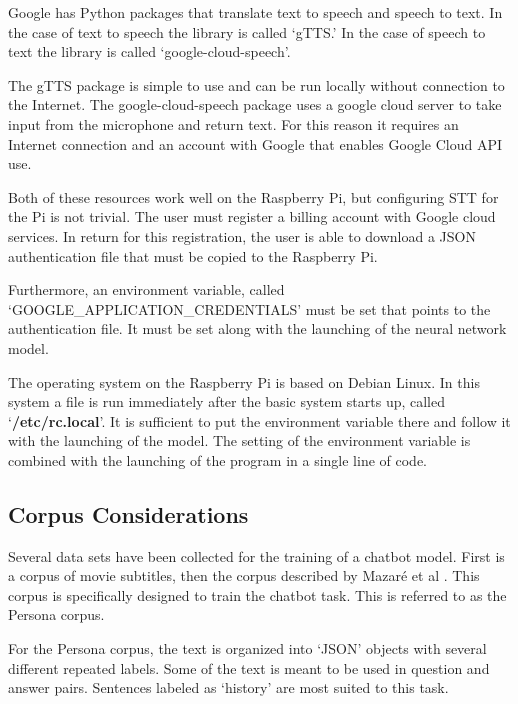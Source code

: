 Google has Python packages that translate text to speech and speech to text. In the case of text to speech the library is called `\ac{gTTS}.' In the case of speech to text the library is called `google-cloud-speech'. 

The gTTS package is simple to use and can be run locally without connection to the Internet. The google-cloud-speech package uses a google cloud server to take input from the microphone and return text. For this reason it requires an Internet connection and an account with Google that enables Google Cloud API use. %

Both of these resources work well on the Raspberry Pi, but configuring STT for the Pi is not trivial. The user must register a billing account with Google cloud services. In return for this registration, the user is able to download a JSON authentication file that must be copied to the Raspberry Pi. 

Furthermore, an environment variable, called `GOOGLE\_APPLICATION\_CREDENTIALS' must be set that points to the authentication file. It must be set along with the launching of the neural network model.

The operating system on the Raspberry Pi is based on Debian Linux. In this system a file is run immediately after the basic system starts up, called `\textbf{/etc/rc.local}'. It is sufficient to put the environment variable there and follow it with the launching of the model. The setting of the environment variable is combined with the launching of the program in a single line of code.


\subsection{Corpus Considerations}

Several data sets have been collected for the training of a chatbot model. First is a corpus of movie subtitles, then the corpus described by Mazar{\'{e}} et al \cite{DBLP:journals/corr/abs-1809-01984}. This corpus is specifically designed to train the chatbot task. This is referred to as the Persona corpus.

For the Persona corpus, the text is organized into `JSON' objects with several different repeated labels. Some of the text is meant to be used in question and answer pairs. Sentences labeled as `history' are most suited to this task. %

